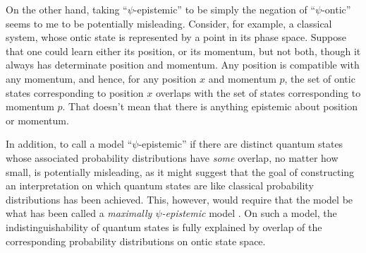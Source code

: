 \documentclass[12pt]{article}
\begin{document}
On the other hand, taking ``$\psi$-epistemic''  to be simply the negation of ``$\psi$-ontic'' seems to me to be potentially misleading.  Consider, for example, a classical system, whose ontic state is represented by a point in its phase space.  Suppose that one could learn either its position, or its momentum, but not both, though it always has determinate position and momentum.  Any position is compatible with any momentum, and hence, for any position $x$ and momentum $p$, the set of ontic  states corresponding to  position $x$ overlaps with the set of states corresponding to momentum $p$. That doesn't mean that there is anything epistemic about position or momentum.


In addition, to call a model ``$\psi$-epistemic'' if there are distinct quantum states whose associated probability distributions have \emph{some} overlap, no matter how small, is potentially misleading, as it might suggest that the goal of constructing an interpretation on which quantum states are like classical probability distributions has been achieved.  This, however, would require that   the model be what has been called a \emph{maximally $\psi$-epistemic} model \citep{BCLM}.  On such a model, the indistinguishability of quantum states is fully explained by overlap of the corresponding probability distributions on ontic state space.
\end{document}
